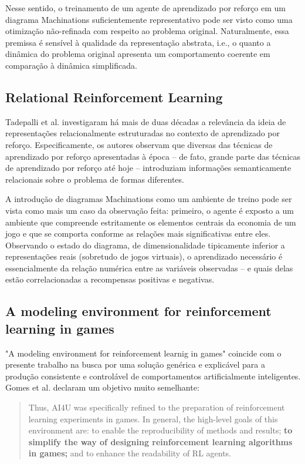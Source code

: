\documentclass[conference]{IEEEtran}
\begin{document}
Nesse sentido, o treinamento de um agente de aprendizado por reforço em um diagrama Machinations suficientemente representativo pode ser visto como uma otimização não-refinada com respeito ao problema original. Naturalmente, essa premissa é sensível à qualidade da representação abstrata, i.e., o quanto a dinâmica do problema original apresenta um comportamento coerente em comparação à dinâmica simplificada.

\subsection{Relational Reinforcement Learning}
Tadepalli et al. \cite{rrl} investigaram há mais de duas décadas a relevância da ideia de representações relacionalmente estruturadas no contexto de aprendizado por reforço. Especificamente, os autores observam que diversas das técnicas de aprendizado por reforço apresentadas à época -- de fato, grande parte das técnicas de aprendizado por reforço até hoje -- introduziam informações semanticamente relacionais sobre o problema de formas diferentes.

A introdução de diagramas Machinations como um ambiente de treino pode ser vista como mais um caso da observação feita: primeiro, o agente é exposto a um ambiente que compreende estritamente os elementos centrais da economia de um jogo e que se comporta conforme as relações mais significativas entre eles. Observando o estado do diagrama, de dimensionalidade tipicamente inferior a representações reais (sobretudo de jogos virtuais), o aprendizado necessário é essencialmente da relação numérica entre as variáveis observadas -- e quais delas estão correlacionadas a recompensas positivas e negativas.

\subsection{A modeling environment for reinforcement learning in games}
"A modeling environment for reinforcement learnig in games" coincide com o presente trabalho na busca por uma solução genérica e explicável para a produção consistente e controlável de comportamentos artificialmente inteligentes. Gomes et al.\cite{modeling-rl-games} declaram um objetivo muito semelhante:
\begin{quote}
    Thus, AI4U was specifically refined to the preparation of reinforcement learning experiments in games. In general, the high-level goals of this environment are: to enable the reproducibility of methods and results; \textbf{to simplify the way of designing reinforcement learning algorithms in games;} and to enhance the readability of RL agents.
\end{quote}
\end{document}
